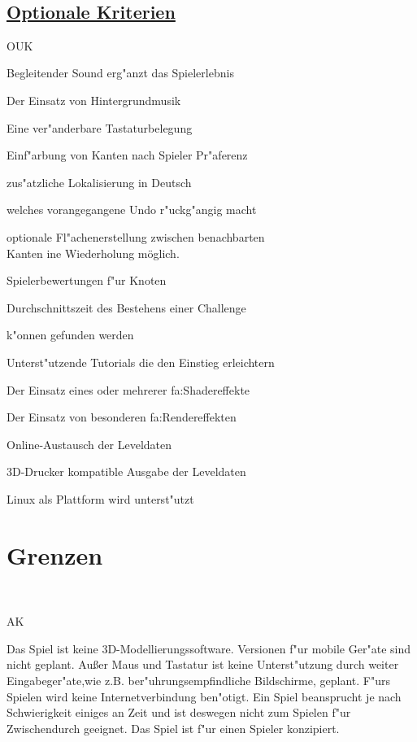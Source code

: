 ~\\


\subsection*{\underline{Optionale Kriterien}}

\begin{ids}{\gls{OUK}}


\id[10] Begleitender Sound erg{"a}nzt das Spielerlebnis

\id[20] Der Einsatz von Hintergrundmusik

\id[30] Eine ver{"a}nderbare Tastaturbelegung

\id[40] Einf{"a}rbung von Kanten nach Spieler Pr{"a}ferenz

\id[50] zus{"a}tzliche Lokalisierung in Deutsch

 welches vorangegangene Undo r{"u}ckg{"a}ngig macht

\id[70] optionale Fl{"a}chenerstellung zwischen benachbarten \\Kanten
ine Wiederholung möglich.

\id[90] Spielerbewertungen f{"u}r Knoten

\id[100] Durchschnittszeit des Bestehens einer Challenge

 k{"o}nnen gefunden werden

\id[120] Unterst{"u}tzende Tutorials die den Einstieg erleichtern
	
\id[130] Der Einsatz eines oder mehrerer \gls{fa:Shadereffekte}

\id[140] Der Einsatz von besonderen \gls{fa:Rendereffekte}n

\id[150] Online-Austausch der Leveldaten

\id[160] 3D-Drucker kompatible Ausgabe der Leveldaten

\id[170] Linux als Plattform wird unterst{"u}tzt

\end{ids}


%
%
\clearpage


\section{Grenzen}
\label{UF:Grenzen}

~\\

\begin{ids}{\gls{AK}}

	
	\id[10] Das Spiel ist keine 3D-Modellierungssoftware.
	\id[20] Versionen f{"u}r mobile Ger{"a}te sind nicht geplant.
	\id[20] Außer Maus und Tastatur ist keine Unterst{"u}tzung durch weiter Eingabeger{"a}te,wie z.B.  ber{"u}hrungsempfindliche Bildschirme, geplant.
	\id[40]F{"u}rs Spielen wird keine Internetverbindung ben{"o}tigt. 
	\id[50] Ein Spiel beansprucht je nach Schwierigkeit einiges an Zeit und ist deswegen nicht zum Spielen f{"u}r Zwischendurch geeignet.
	\id[60] Das Spiel ist f{"u}r einen Spieler konzipiert.
	
\end{ids}



